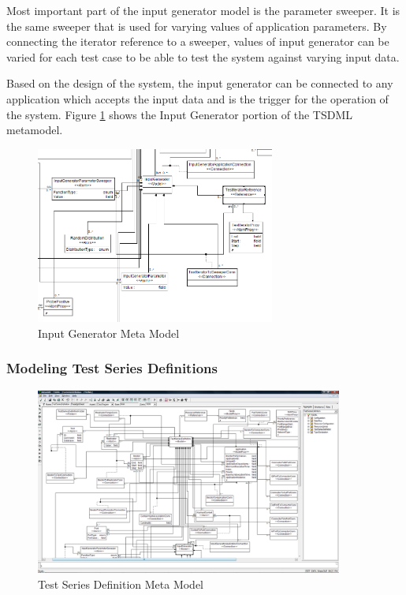 Most important part of the input generator model is the parameter sweeper. It is the same sweeper that is used for varying values of application parameters. By connecting the iterator reference to a sweeper, values of input generator can be varied for each test case to be able to test the system against varying input data.

Based on the design of the system, the input generator can be connected to any application which accepts the input data and is the trigger for the operation of the system. Figure \ref{fig:InputGeneratorMetaModel} shows the Input Generator portion of the TSDML metamodel.

\begin{figure}[htb]
	\centering
		\includegraphics[width=0.70\textwidth]{figures/InputGeneratorMetaModel.PNG}
	\caption{Input Generator Meta Model}
	\label{fig:InputGeneratorMetaModel}
\end{figure}

\subsubsection{Modeling Test Series Definitions}

\begin{figure}[tbp]
	\centering
		\includegraphics[width=0.90\textwidth]{figures/TestSeriesDefinition.png}
	\caption{Test Series Definition Meta Model}
	\label{fig:TestSeriesDefinition}
\end{figure}

